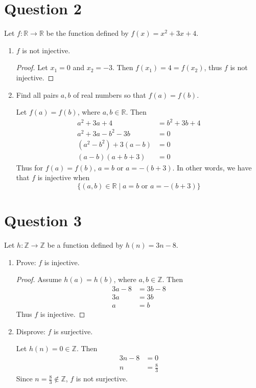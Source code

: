 \documentclass[11pt, oneside]{article}   	%
\begin{document}
\section*{Question 2}

Let $f : \mathbb{R} \to \mathbb{R}$ be the function defined by $f(x)=x^2+3x+4$.
\begin{enumerate}[\quad(a)]
	\item $f$ is not injective.
		\begin{proof} 
		Let $x_1=0$ and $x_2=-3$. Then $f(x_1) = 4 = f(x_2)$, thus $f$ is not injective.
		\end{proof}
	\item Find all pairs $a,b$ of real numbers so that $f(a) = f(b)$.
	
	Let $f(a) = f(b)$, where $a,b \in \mathbb{R}$. Then
	\begin{align*}
		a^2+3a+4 & = b^2+3b+4 \\
		a^2+3a-b^2-3b & = 0 \\
		(a^2-b^2) + 3(a-b) & = 0 \\
		(a-b)(a+b+3) & = 0
	\end{align*}
	Thus for $f(a)=f(b)$, $a=b$ or $a=-(b+3)$. In other words, we have that $f$ is injective when $$\{(a,b) \in \mathbb{R} \mid a=b \text{ or } a=-(b+3) \}$$
\end{enumerate}


\section*{Question 3}

 Let $h:\mathbb{Z} \to \mathbb{Z}$ be a function defined by $h(n) = 3n-8$.
\begin{enumerate}[\quad(a)]
	\item Prove: $f$ is injective.
		\begin{proof} 
		Assume $h(a) = h(b)$, where $a,b \in \mathbb{Z}$. Then
		\begin{align*}
			3a-8 & = 3b-8 \\
			3a & = 3b \\
			a& = b 
		\end{align*}
		Thus $f$ is injective.
		\end{proof}
	\item Disprove: $f$ is surjective.
	
	Let $h(n) =0 \in \mathbb{Z}$. Then
	\begin{align*}
		3n-8 & = 0 \\
		n & = \frac{8}{3} 
	\end{align*}
	Since $n=\frac{8}{3} \notin \mathbb{Z}$, $f$ is not surjective.
\end{enumerate}
\end{document}
